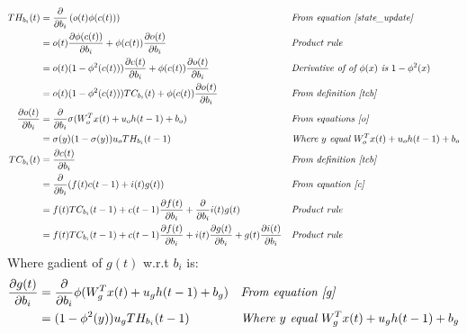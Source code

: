 \documentclass{article}
\begin{document}
\begin{align*}
TH_{b_i}(t) & = \frac{\partial}{\partial b_i} \left ( o(t) \phi(c(t)) \right ) && \textit{From equation \ref{state_update}} \\
& = o(t) \frac{\partial \phi(c(t))}{\partial b_i}  + \phi(c(t)) \frac{\partial o(t)}{\partial b_i}   && \textit{Product rule} \\
&= o(t) (1-\phi^{2}(c(t))) \frac{\partial c(t)}{\partial b_i}  + \phi(c(t)) \frac{\partial o(t)}{\partial b_i}   && \textit{Derivative of of $\phi(x)$ is $1-\phi^2(x)$}\\ 
&= o(t) (1-\phi^{2}(c(t))) TC_{b_i}(t)  + \phi(c(t)) \frac{\partial o(t)}{\partial b_i}   && \textit{From definition \ref{tcb} }\\ 
\frac{\partial o(t)}{\partial b_i} &=  \frac{\partial}{\partial b_i} \sigma(W_{o}^T x(t) + u_{o} h(t-1) + b_o) && \textit{From equations \ref{o}}\\
&= \sigma(y)(1-\sigma(y))u_o TH_{b_i}(t-1) && \textit{Where $y$ equal $W_{o}^T x(t) + u_{o} h(t-1) + b_o$} \\
TC_{b_i}(t) &=  \frac{\partial c(t)}{\partial b_i} && \textit{From definition \ref{tcb}} \\ 
&=  \frac{\partial}{\partial b_i} (f(t)  c(t-1) + i(t) g(t))  && \textit{From equation \ref{c}} \\
&= f(t) TC_{b_i}(t-1) + c(t-1)\frac{\partial f(t)}{ \partial b_i} + \frac{\partial}{\partial b_i}  i(t) g(t)   && \textit{Product rule}\\
&= f(t) TC_{b_i}(t-1) + c(t-1)\frac{\partial f(t)}{ \partial b_i} + i(t)\frac{\partial g(t) }{\partial b_i}  + g(t)\frac{\partial i(t) }{\partial b_i}  && \textit{Product rule} 
\end{align*}
Where gadient of  $g(t)$  w.r.t $b_i$ is:
\begin{align*}
\frac{\partial g(t)}{\partial b_i} &=  \frac{\partial}{\partial b_i} \phi(W_{g}^T x(t) + u_{g} h(t-1) + b_g) && \textit{From equation \ref{g}} \\
&= (1-\phi^2(y))u_g TH_{b_i}(t-1) && \textit{Where $y$ equal $W_{g}^T x(t) + u_{g} h(t-1) + b_g$} \\
\end{align*}
\end{document}
